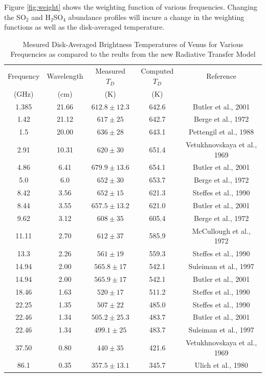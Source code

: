 Figure \ref{fig:weight} shows the weighting function of various frequencies. Changing the SO$_2$ and H$_2$SO$_4$ abundance profiles will incure a change in the weighting functions as well as the disk-averaged temperature.
\begin{table}[h]
 \centering 
\caption{Mesured Disk-Averaged Brightness Temperatures of Venus for Various Frequencies as compared to the reults from the new Radiative Transfer Model}
\begin{tabular}{||c|c|c|c|c||}
\hline
Frequency & Wavelength & Measured $T_D$ & Computed $T_D$ & Reference\\
(GHz) & (cm) &(K)&(K)& \\
\hline
1.385 	& 21.66	 	&$612.8 \pm 12.3$	&642.6  &Butler et al., 2001 			\cite{Butler-2001}\\
1.42 	& 21.12 	&$617 	\pm 25$		&642.7  &Berge et al., 1972 			\cite{Berge-1972}\\
1.5 	& 20.00 	&$636 	\pm 28$		&643.1  &Pettengil et al., 1988 		\cite{Pettengil-1988}\\
2.91 	& 10.31 	&$620 	\pm 30$		&651.4  &Vetukhnovskaya et al., 1969 	\cite{Vetukhnovskaya-1969}\\
4.86 	& 6.41	 	&$679.9 \pm 13.6$	&654.1  &Butler et al., 2001 			\cite{Butler-2001}\\
5.0 	& 6.0 		&$652 	\pm 30$		&653.7  &Berge et al., 1972 			\cite{Berge-1972}\\
8.42 	& 3.56	 	&$652 	\pm 15$		&621.3  &Steffes et al., 1990 			\cite{Steffes-1990}\\
8.44 	& 3.55	 	&$657.5 \pm 13.2$	&621.0  &Butler et al., 2001 			\cite{Butler-2001}\\
9.62 	& 3.12	 	&$608 	\pm 35$		&605.4  &Berge et al., 1972 			\cite{Berge-1972}\\
11.11 	& 2.70	 	&$612 	\pm 37$		&585.9  &McCullough et al., 1972 		\cite{McCullough-1972}\\
13.3	& 2.26	 	&$561 	\pm 19$		&559.3  &Steffes et al., 1990			\cite{Steffes-1990}\\
14.94 	& 2.00	 	&$565.8 \pm 17$		&542.1  &Suleiman et al., 1997 			\cite{Suleiman-thesis}\\
14.94 	& 2.00	 	&$565.9 \pm 17$		&542.1  &Butler et al., 2001 			\cite{Butler-2001}\\
18.46 	& 1.63	 	&$520 	\pm 17$		&511.2  &Steffes et al., 1990			\cite{Steffes-1990}\\
22.25 	& 1.35	 	&$507 	\pm 22$		&485.0  &Steffes et al., 1990			\cite{Steffes-1990}\\
22.46 	& 1.34	 	&$505.2 \pm 25.3$	&483.7  &Butler et al., 2001 			\cite{Butler-2001}\\
22.46 	& 1.34	 	&$499.1 \pm 25$		&483.7  &Suleiman et al., 1997 			\cite{Suleiman-thesis}\\
37.50 	& 0.80	 	&$440 	\pm 35$		&421.6  &Vetukhnovskaya et al., 1969 	\cite{Vetukhnovskaya-1969}\\
86.1 	& 0.35	 	&$357.5	\pm 13.1$	&345.7  &Ulich et al., 1980 			\cite{Ulich-1980}\\
\hline
\end{tabular}
\label{tab:rtm-results}
\end{table}

